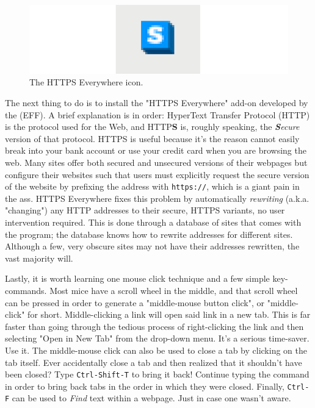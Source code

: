 \documentclass{article}
\begin{document}
\begin{figure}
\includegraphics[scale=0.5]{files/blog/2018_01_17_better_browsing_with_firefox/2018_01_17_httpseverywhere_icon.png}
\caption{The HTTPS Everywhere icon.}
\end{figure}
The next thing to do is to install the "HTTPS Everywhere" add-on developed by the  (EFF).  A brief explanation is in order: HyperText Transfer Protocol (HTTP) is the protocol used for the Web, and HTTP\textbf{S} is, roughly speaking, the \textit{\textbf{S}ecure} version of that protocol.  HTTPS is useful because it's the reason  cannot easily break into your bank account or use your credit card when you are browsing the web.  Many sites offer both secured and unsecured versions of their webpages but configure their websites such that users must explicitly request the secure version of the website by prefixing the address with \texttt{https://}, which is a giant pain in the ass.  HTTPS Everywhere fixes this problem by automatically \textit{rewriting} (a.k.a. "changing") any HTTP addresses to their secure, HTTPS variants, no user intervention required.  This is done through a database of sites that comes with the program; the database knows how to rewrite addresses for different sites.  Although a few, very obscure sites may not have their addresses rewritten, the vast majority will.

Lastly, it is worth learning one mouse click technique and a few simple key-commands.  Most mice have a scroll wheel in the middle, and that scroll wheel can be pressed in order to generate a "middle-mouse button click", or "middle-click" for short.  Middle-clicking a link will open said link in a new tab.  This is far faster than going through the tedious process of right-clicking the link and then selecting "Open in New Tab" from the drop-down menu.  It's a serious time-saver.  Use it.  The middle-mouse click can also be used to close a tab by clicking on the tab itself.  Ever accidentally close a tab and then realized that it shouldn't have been closed?  Type \texttt{Ctrl-Shift-T} to bring it back!  Continue typing the command in order to bring back tabs in the order in which they were closed.  Finally, \texttt{Ctrl-F} can be used to \textit{Find} text within a webpage.  Just in case one wasn't aware.
\end{document}
